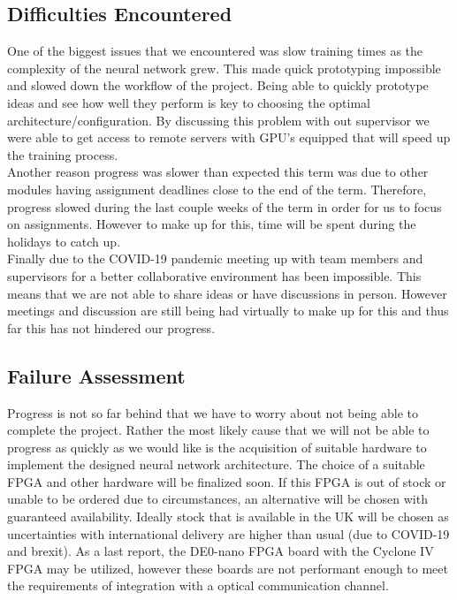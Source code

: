 
\iffalse


\fi

\subsection{Difficulties Encountered}

    One of the biggest issues that we encountered was slow training times as the complexity of the neural network grew. This made quick prototyping impossible and slowed down the workflow of the project. Being able to quickly prototype ideas and see how well they perform is key to choosing the optimal architecture/configuration. By discussing this problem with out supervisor we were able to get access to remote servers with GPU's equipped that will speed up the training process.\\
    
    Another reason progress was slower than expected this term was due to other modules having assignment deadlines close to the end of the term. Therefore, progress slowed during the last couple weeks of the term in order for us to focus on assignments. However to make up for this, time will be spent during the holidays to catch up.\\
    
    Finally due to the COVID-19 pandemic meeting up with team members and supervisors for a better collaborative environment has been impossible. This means that we are not able to share ideas or have discussions in person. However meetings and discussion are still being had virtually to make up for this and thus far this has not hindered our progress.

\subsection{Failure Assessment}

    Progress is not so far behind that we have to worry about not being able to complete the project. Rather the most likely cause that we will not be able to progress as quickly as we would like is the acquisition of suitable hardware to implement the designed neural network architecture. The choice of a suitable FPGA and other hardware will be finalized soon. If this FPGA is out of stock or unable to be ordered due to circumstances, an alternative will be chosen with guaranteed availability. Ideally stock that is available in the UK will be chosen as uncertainties with international delivery are higher than usual (due to COVID-19 and brexit). As a last report, the DE0-nano FPGA board with the Cyclone IV FPGA may be utilized, however these boards are not performant enough to meet the requirements of integration with a optical communication channel.\\
    
